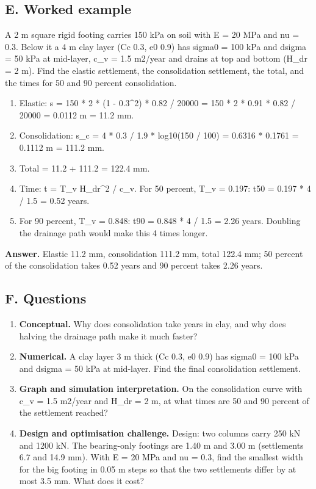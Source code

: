 \documentclass[11pt,a4paper]{article}
\begin{document}
\subsection*{E. Worked example}
A 2 m square rigid footing carries 150 kPa on soil with E = 20 MPa and nu = 0.3. Below it a 4 m clay layer (Cc 0.3, e0 0.9) has sigma0 = 100 kPa and dsigma = 50 kPa at mid-layer, c\_v = 1.5 m2/year and drains at top and bottom (H\_dr = 2 m). Find the elastic settlement, the consolidation settlement, the total, and the times for 50 and 90 percent consolidation.
\begin{enumerate}[nosep]
\item Elastic: s = 150 * 2 * (1 - 0.3\textasciicircum{}2) * 0.82 / 20000 = 150 * 2 * 0.91 * 0.82 / 20000 = 0.0112 m = 11.2 mm.
\item Consolidation: s\_c = 4 * 0.3 / 1.9 * log10(150 / 100) = 0.6316 * 0.1761 = 0.1112 m = 111.2 mm.
\item Total = 11.2 + 111.2 = 122.4 mm.
\item Time: t = T\_v H\_dr\textasciicircum{}2 / c\_v. For 50 percent, T\_v = 0.197: t50 = 0.197 * 4 / 1.5 = 0.52 years.
\item For 90 percent, T\_v = 0.848: t90 = 0.848 * 4 / 1.5 = 2.26 years. Doubling the drainage path would make this 4 times longer.
\end{enumerate}
\textbf{Answer.} Elastic 11.2 mm, consolidation 111.2 mm, total 122.4 mm; 50 percent of the consolidation takes 0.52 years and 90 percent takes 2.26 years.

\subsection*{F. Questions}
\begin{enumerate}[nosep]
\item \textbf{Conceptual.} Why does consolidation take years in clay, and why does halving the drainage path make it much faster?
\item \textbf{Numerical.} A clay layer 3 m thick (Cc 0.3, e0 0.9) has sigma0 = 100 kPa and dsigma = 50 kPa at mid-layer. Find the final consolidation settlement.
\item \textbf{Graph and simulation interpretation.} On the consolidation curve with c\_v = 1.5 m2/year and H\_dr = 2 m, at what times are 50 and 90 percent of the settlement reached?
\item \textbf{Design and optimisation challenge.} Design: two columns carry 250 kN and 1200 kN. The bearing-only footings are 1.40 m and 3.00 m (settlements 6.7 and 14.9 mm). With E = 20 MPa and nu = 0.3, find the smallest width for the big footing in 0.05 m steps so that the two settlements differ by at most 3.5 mm. What does it cost?
\end{enumerate}
\end{document}

